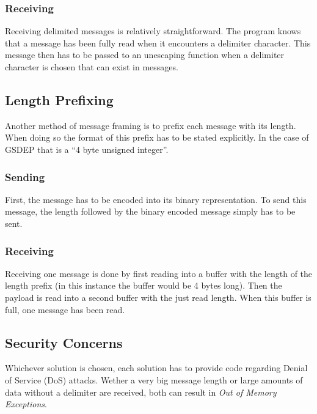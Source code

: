\subsubsection{Receiving}

Receiving delimited messages is relatively straightforward. The program knows that a message has been fully read when it encounters a delimiter character. This message then has to be passed to an unescaping function when a delimiter character is chosen that can exist in messages.

\subsection{Length Prefixing}

Another method of message framing is to prefix each message with its length. When doing so the format of this prefix has to be stated explicitly. In the case of GSDEP that is a ``4 byte unsigned integer''.

\subsubsection{Sending}

First, the message has to be encoded into its binary representation. To send this message, the length followed by the binary encoded message simply has to be sent.

\subsubsection{Receiving}

Receiving one message is done by first reading into a buffer with the length of the length prefix (in this instance the buffer would be 4 bytes long). Then the payload is read into a second buffer with the just read length. When this buffer is full, one message has been read.

\subsection{Security Concerns}

Whichever solution is chosen, each solution has to provide code regarding Denial of Service (DoS) attacks. Wether a very big message length or large amounts of data without a delimiter are received, both can result in \textit{Out of Memory Exceptions}.
